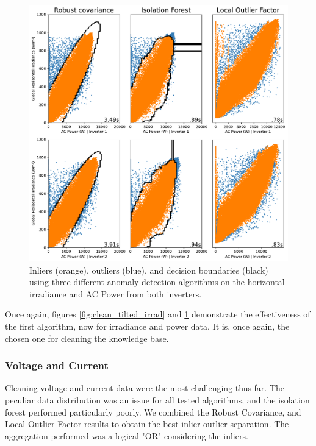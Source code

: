 \begin{figure}[h!]
    \centering
    \includegraphics[width=\textwidth]{figures/chapter5/cleaning/22_cleaning_horizontal_irrad.pdf}
    \caption{Inliers (orange), outliers (blue), and decision boundaries (black) using three different anomaly detection algorithms on the horizontal irradiance and AC Power from both inverters.}
    \label{fig:clean_horizontal_irrad}
\end{figure}

Once again, figures \ref{fig:clean_tilted_irrad} and \ref{fig:clean_horizontal_irrad} demonstrate the effectiveness of the first algorithm, now for irradiance and power data. It is, once again, the chosen one for cleaning the knowledge base.

\subsubsection{Voltage and Current}

Cleaning voltage and current data were the most challenging thus far. The peculiar data distribution was an issue for all tested algorithms, and the isolation forest performed particularly poorly. We combined the Robust Covariance, and Local Outlier Factor results to obtain the best inlier-outlier separation. The aggregation performed was a logical "OR" considering the inliers.

